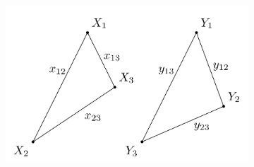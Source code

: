 \documentclass{article}
\begin{document}
\begin{figure}[t]
	\centering
%				
%				
%				
%				
%				
%				
%				
%				
	\begin{subfigure}[t]{0.49\textwidth}
		\includegraphics[width=\textwidth]{../simulation/motivating_geometry.png}

\end{subfigure}
\end{figure}
\end{document}
